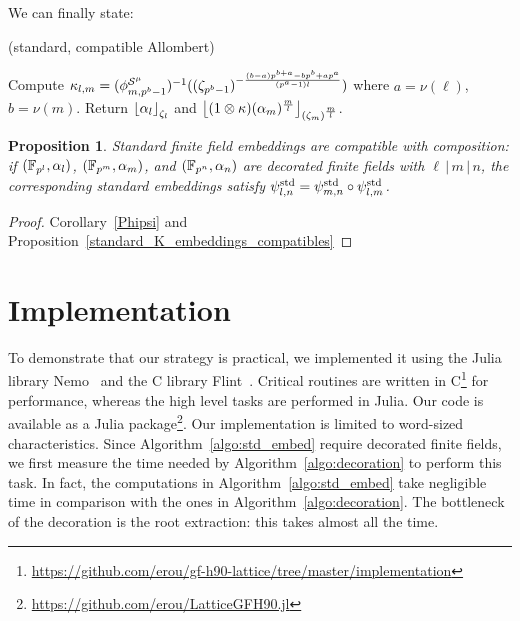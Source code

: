 \documentclass{sig-alternate}
\newtheorem{proposition}[theorem]{Proposition}
\begin{document}
We can finally state:
\begin{algorithm}
  \caption{(standard, compatible Allombert)}
  \label{algo:std_embed}
  \begin{algorithmic}[1]
  \STATE Compute $\kappa_{l,m}=({\phi^{\mathcal{S}^\mu}_{{m},{p^b-1}}})^{-1}((\zeta_{p^b-1})^{-\frac{(b-a)p^{b+a}-bp^b+ap^a}{(p^a-1)l}})$ where $a=\nu(\ell)$, $b=\nu(m)$.
  \STATE Return $\left\lfloor \alpha_l \right\rfloor_{\zeta_l}$ and $\left\lfloor (1\otimes\kappa)(\alpha_m)^{\frac{m}{l}} \right\rfloor_{(\zeta_m)^{\frac{m}{l}}}$.
  \end{algorithmic}
\end{algorithm}
\begin{proposition}
\label{standard_ff_embeddings_compatibles}
Standard finite field embeddings are compatible with composition:
if $(\mathbb{F}_{p^l},\alpha_l)$, $(\mathbb{F}_{p^m},\alpha_m)$, and $(\mathbb{F}_{p^n},\alpha_n)$ are decorated finite fields
with $\ell\,|\,m\,|\,n$, the corresponding standard embeddings
satisfy ${\psi^{\textrm{std}}_{{l},{n}}}={\psi^{\textrm{std}}_{{m},{n}}}\circ{\psi^{\textrm{std}}_{{l},{m}}}$.
\end{proposition}
\begin{proof}
Corollary~\ref{Phipsi} and Proposition~\ref{standard_K_embeddings_compatibles}
\end{proof}

\section{Implementation}
\label{sec:implementation}

To demonstrate that our strategy is practical, we implemented it using the
Julia library Nemo~\cite{Fieker:2017:NCA:3087604.3087611} and the C library
Flint~\cite{flint}. Critical routines are written in
C\footnote{\url{https://github.com/erou/gf-h90-lattice/tree/master/implementation}}
for performance, whereas the high level tasks are performed in Julia. Our code is available as a Julia
package\footnote{\url{https://github.com/erou/LatticeGFH90.jl}}. Our
implementation is limited to word-sized characteristics. Since Algorithm~\ref{algo:std_embed} require decorated finite
fields, we first measure the time needed by Algorithm~\ref{algo:decoration} to
perform this task. In fact, the computations in Algorithm~\ref{algo:std_embed}
take negligible time in comparison with the ones in
Algorithm~\ref{algo:decoration}. The bottleneck of the decoration is the root
extraction: this takes almost all the time.



\end{document}

